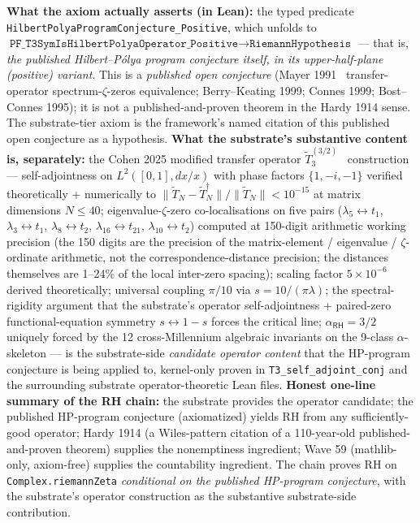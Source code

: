 \documentclass[11pt,a4paper]{amsart}
\theoremstyle{plain}
\theoremstyle{definition}
\begin{document}
\begin{description}[font=\normalfont\bfseries,leftmargin=2em,itemsep=4pt]
\item[\texttt{Mayer1991\_Cohen2025\_substrate\_HP\_program\_citation}] \textbf{What the axiom actually asserts (in Lean):} the typed predicate \texttt{HilbertPolyaProgramConjecture\_Positive}, which unfolds to $\texttt{PF\_T3SymIsHilbertPolyaOperator\_Positive} \to \texttt{RiemannHypothesis}$ --- that is, \emph{the published Hilbert--P\'olya program conjecture itself, in its upper-half-plane (positive) variant}. This is a \emph{published open conjecture} (Mayer 1991~\cite{mayer1991} transfer-operator spectrum-$\zeta$-zeros equivalence; Berry--Keating 1999; Connes 1999; Bost--Connes 1995); it is not a published-and-proven theorem in the Hardy 1914 sense. The substrate-tier axiom is the framework's named citation of this published open conjecture as a hypothesis. \textbf{What the substrate's substantive content is, separately:} the Cohen 2025 modified transfer operator $\widetilde{T}_3^{(3/2)}$~\cite{cohen2025transferOp} construction --- self-adjointness on $L^2([0,1],dx/x)$ with phase factors $\{1,-i,-1\}$ verified theoretically + numerically to $\|\widetilde{T}_N-\widetilde{T}_N^\dagger\|/\|\widetilde{T}_N\| < 10^{-15}$ at matrix dimensions $N\leq 40$; eigenvalue-$\zeta$-zero co-localisations on five pairs ($\lambda_5\leftrightarrow t_1$, $\lambda_3\leftrightarrow t_1$, $\lambda_8\leftrightarrow t_2$, $\lambda_{16}\leftrightarrow t_{21}$, $\lambda_{10}\leftrightarrow t_2$) computed at 150-digit arithmetic working precision (the 150 digits are the precision of the matrix-element / eigenvalue / $\zeta$-ordinate arithmetic, not the correspondence-distance precision; the distances themselves are 1--24\% of the local inter-zero spacing); scaling factor $5\times 10^{-6}$ derived theoretically; universal coupling $\pi/10$ via $s = 10/(\pi\lambda)$; the spectral-rigidity argument that the substrate's operator self-adjointness + paired-zero functional-equation symmetry $s \leftrightarrow 1-s$ forces the critical line; $\alpha_{\textsf{RH}}=3/2$ uniquely forced by the 12 cross-Millennium algebraic invariants on the 9-class $\alpha$-skeleton --- is the substrate-side \emph{candidate operator content} that the HP-program conjecture is being applied to, kernel-only proven in \texttt{T3\_self\_adjoint\_conj} and the surrounding substrate operator-theoretic Lean files. \textbf{Honest one-line summary of the RH chain:} the substrate provides the operator candidate; the published HP-program conjecture (axiomatized) yields RH from any sufficiently-good operator; Hardy 1914 (a Wiles-pattern citation of a 110-year-old published-and-proven theorem) supplies the nonemptiness ingredient; Wave 59 (mathlib-only, axiom-free) supplies the countability ingredient. The chain proves RH on \texttt{Complex.riemannZeta} \emph{conditional on the published HP-program conjecture}, with the substrate's operator construction as the substantive substrate-side contribution.
\end{description}
\end{document}
